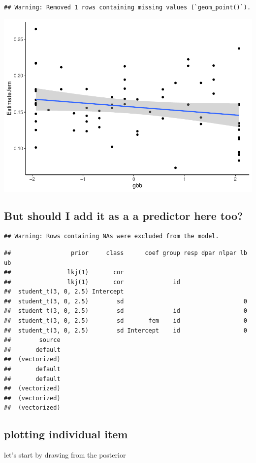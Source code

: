 \documentclass[
  man]{apa7}
\begin{document}
\begin{verbatim}
## Warning: Removed 1 rows containing missing values (`geom_point()`).
\end{verbatim}

\includegraphics{resp_opts_manus23022_files/figure-latex/unnamed-chunk-13-1.pdf}

\hypertarget{but-should-i-add-it-as-a-a-predictor-here-too}{%
\subsection{But should I add it as a a predictor here too?}\label{but-should-i-add-it-as-a-a-predictor-here-too}}

\begin{verbatim}
## Warning: Rows containing NAs were excluded from the model.
\end{verbatim}

\begin{verbatim}
##                 prior     class      coef group resp dpar nlpar lb ub
##                lkj(1)       cor                                      
##                lkj(1)       cor              id                      
##  student_t(3, 0, 2.5) Intercept                                      
##  student_t(3, 0, 2.5)        sd                                  0   
##  student_t(3, 0, 2.5)        sd              id                  0   
##  student_t(3, 0, 2.5)        sd       fem    id                  0   
##  student_t(3, 0, 2.5)        sd Intercept    id                  0   
##        source
##       default
##  (vectorized)
##       default
##       default
##  (vectorized)
##  (vectorized)
##  (vectorized)
\end{verbatim}

\hypertarget{plotting-individual-item}{%
\subsection{plotting individual item}\label{plotting-individual-item}}

let's start by drawing from the posterior
\end{document}
